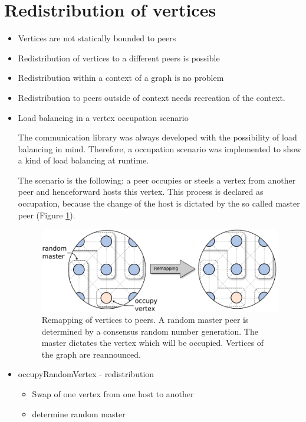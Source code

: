 \section{Redistribution of vertices}
\begin{itemize}
\item Vertices are not statically bounded to peers
\item Redistribution of vertices to a different peers is possible
\item Redistribution within a context of a graph is no problem
\item Redistribution to peers outside of context needs recreation of
  the context.

\item Load balancing in a vertex occupation scenario

  The communication library was always developed with the possibility
  of load balancing in mind.  Therefore, a occupation scenario was
  implemented to show a kind of load balancing at runtime.

  The scenario is the following: a peer occupies or steels a vertex
  from another peer and henceforward hosts this vertex.  This process
  is declared as occupation, because the change of the host is
  dictated by the so called master peer (Figure
  \ref{fig:gol_remapping}).

  \begin{figure}[H]
    \centering
    \includegraphics[width=\textwidth]{graphics/40_gol_remapping}
    \caption{Remapping of vertices to peers. A random master peer is
      determined by a consensus random number generation. The master
      dictates the vertex which will be occupied. Vertices of the
      graph are reannounced.}
    \label{fig:gol_remapping}
  \end{figure}

\item occupyRandomVertex - redistribution
  \begin{itemize}
  \item Swap of one vertex from one host to another
  \item determine random master
    

\end{itemize}
\end{itemize}
